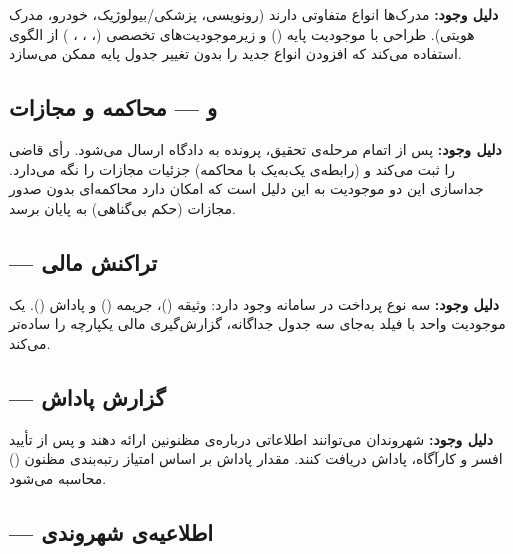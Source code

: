 \documentclass[12pt]{article} %
\theoremstyle{definition}
\begin{document}
\textbf{دلیل وجود:}
مدرک‌ها انواع متفاوتی دارند (رونویسی، پزشکی/بیولوژیک، خودرو، مدرک هویتی).
طراحی با موجودیت پایه () و زیرموجودیت‌های تخصصی
(، ، ، )
از الگوی  استفاده می‌کند که افزودن انواع جدید را بدون تغییر جدول پایه ممکن می‌سازد.

\subsection{ و  — محاکمه و مجازات}

\textbf{دلیل وجود:}
پس از اتمام مرحله‌ی تحقیق، پرونده به دادگاه ارسال می‌شود.
 رأی قاضی را ثبت می‌کند و  (رابطه‌ی یک‌به‌یک با محاکمه) جزئیات مجازات را نگه می‌دارد.
جداسازی این دو موجودیت به این دلیل است که امکان دارد محاکمه‌ای بدون صدور مجازات (حکم بی‌گناهی) به پایان برسد.

\subsection{ — تراکنش مالی}

\textbf{دلیل وجود:}
سه نوع پرداخت در سامانه وجود دارد: وثیقه ()، جریمه () و پاداش ().
یک موجودیت واحد با فیلد  به‌جای سه جدول جداگانه، گزارش‌گیری مالی یکپارچه را ساده‌تر می‌کند.

\subsection{ — گزارش پاداش}

\textbf{دلیل وجود:}
شهروندان می‌توانند اطلاعاتی درباره‌ی مظنونین ارائه دهند و پس از تأیید افسر و کارآگاه، پاداش دریافت کنند.
مقدار پاداش بر اساس امتیاز رتبه‌بندی مظنون () محاسبه می‌شود.

\subsection{ — اطلاعیه‌ی شهروندی}
\end{document}

